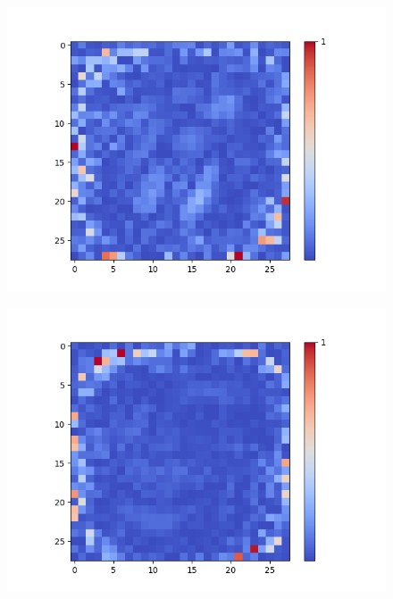 \begin{figure}[H]
	\captionsetup{labelformat=empty}
	\centering
	\begin{minipage}[b]{0.19\textwidth}
		\includegraphics[width=\textwidth]{Linear-AE/Feature-3.png}
		\label{}
	\end{minipage}
	\begin{minipage}[b]{0.19\textwidth}
		\includegraphics[width=\textwidth]{Linear-AE/Feature-7.png}
		\label{}
	\end{minipage}
	\begin{minipage}[b]{0.19\textwidth}

\end{minipage}
\end{figure}
